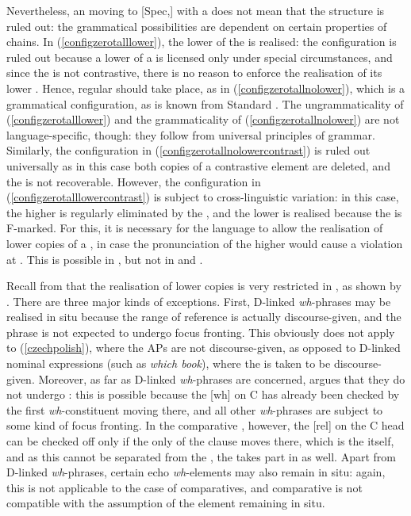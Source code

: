 Nevertheless, an  moving to [Spec,] with a  does not mean that the structure is ruled out: the grammatical possibilities are dependent on certain properties of  chains. In (\ref{configzerotalllower}), the lower  of the  is realised: the configuration is ruled out because a lower  of a  is licensed only under special circumstances, and since the  is not contrastive, there is no reason to enforce the realisation of its lower . Hence, regular  should take place, as in (\ref{configzerotallnolower}), which is a grammatical configuration, as is known from Standard . The ungrammaticality of (\ref{configzerotalllower}) and the grammaticality of (\ref{configzerotallnolower}) are not language-specific, though: they follow from universal principles of grammar. Similarly, the configuration in (\ref{configzerotallnolowercontrast}) is ruled out universally as in this case both copies of a contrastive element are deleted, and the  is not recoverable. However, the configuration in (\ref{configzerotalllowercontrast}) is subject to cross-linguistic variation: in this case, the higher  is regularly eliminated by the , and the lower  is realised because the  is F-marked. For this, it is necessary for the language to allow the realisation of lower copies of a , in case the pronunciation of the higher  would cause a violation at . This is possible in , but not in  and .

Recall from  that the realisation of lower copies is very restricted in , as shown by \citet{boskovic2002}. There are three major kinds of exceptions. First, D-linked \textit{wh}-phrases may be realised in situ because the range of reference is actually discourse-given, and the phrase is not expected to undergo focus fronting. This obviously does not apply to (\ref{czechpolish}), where the APs are not discourse-given, as opposed to D-linked nominal expressions (such as \textit{which book}), where the  is taken to be discourse-given. Moreover, as far as D-linked \textit{wh}-phrases are concerned, \citet{boskovic2002} argues that they do not undergo : this is possible because the [wh]  on C has already been checked by the first \textit{wh}-constituent moving there, and all other \textit{wh}-phrases are subject to some kind of focus fronting. In the comparative , however, the [rel]  on the C head can be checked off only if the only  of the clause moves there, which is the  itself, and as this cannot be separated from the , the  takes part in  as well. Apart from D-linked \textit{wh}-phrases, certain echo \textit{wh}-elements may also remain in situ: again, this is not applicable to the case of comparatives, and comparative  is not compatible with the assumption of the  element remaining in situ.

